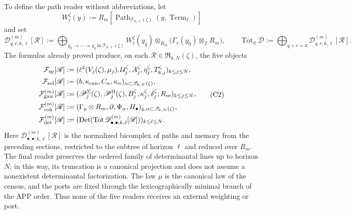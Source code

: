 To define the path reader without abbreviations, let
\[
 W_\ell^\zeta(y):=
 R_m[\operatorname{Path}_{\mathscr T_{k,\ell}(\zeta)}
          (y,\operatorname{Term}_\ell)]
\]
and set
\[
 \mathscr D_{q,r;k,\ell}^{(m)}[\mathscr R]
 :=\bigoplus_{y_0\to\cdots\to y_q\ \text{in}\
                  \mathscr T_{k,\ell}(\zeta)}
 W_\ell^\zeta(y_q)\otimes_{R_m}
 \bigl(\Gamma_r(y_0)\otimes_{\mathbb Z}R_m\bigr),
 \qquad
 \operatorname{Tot}_d\mathscr D
 :=\bigoplus_{q+r=d}\mathscr D_{q,r;k,\ell}^{(m)}[\mathscr R].
\]
The formulas already proved produce, on each
\(\mathscr R\in\mathfrak R_{k,N}(\zeta)\), the five objects
\[
\begin{aligned}
 \mathcal F_{\rm sp}[\mathscr R]
 &:=(\ell^2(V_j(\zeta),\mu_j),
       \mathcal U_j^\zeta,A_j^\zeta,\eta_j^\zeta,
       T_{k,j}^\zeta)_{k\leq j\leq N},\\
 \mathcal F_{\rm sol}[\mathscr R]
 &:=(b,\kappa_{\rm can},C_\alpha,\kappa_\alpha)
      _{\alpha\subset\mathscr T_{k,N}(\zeta)},\\
 \mathcal F_{\rm gau}^{(m)}[\mathscr R]
 &:=(\mathscr P_j^\Sigma(\zeta),\mathscr P_j^\Pi(\zeta),
       B_j^\zeta,\kappa_j^\zeta,\delta_j^\zeta;R_m)_{k\leq j\leq N},\\
 \mathcal F_{\rm coh}^{(m)}[\mathscr R]
 &:=(\Gamma_y\otimes R_m,\partial,\Psi_\alpha,H_\bullet)
      _{y,\alpha\subset\mathscr T_{k,N}(\zeta)},\\
 \mathcal F_{\rm det}^{(m)}[\mathscr R]
 &:=(\operatorname{Det}(\operatorname{Tot}
       \mathscr D_{\bullet,\bullet;k,\ell}^{(m)}[\mathscr R]))
       _{k\leq\ell\leq N}.
\end{aligned}
\tag{C2}
\label{ix:eq:cinco-lectores-comunes}
\]
Here \(\mathscr D_{\bullet,\bullet;k,\ell}^{(m)}[\mathscr R]\) is the
normalized bicomplex
of paths and memory from the preceding sections, restricted to the subtree of
horizon \(\ell\) and reduced over \(R_m\). The final reader preserves the
ordered family of determinantal lines up to horizon \(N\); in this
way, its truncation is a canonical projection and does not assume a
nonexistent determinantal factorization. The law \(\mu\) is the canonical law
of the census, and the ports are fixed through the lexicographically minimal branch
of the APP order. Thus none of the five readers receives an external weighting
or port.

